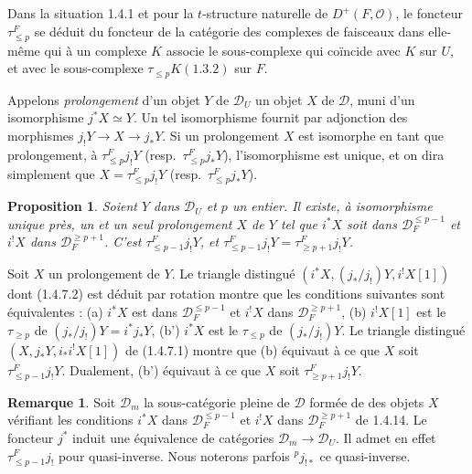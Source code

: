 \documentclass[12pt,a4paper]{article}
\theoremstyle{plain}
\newtheorem{proposition}[theorem]{Proposition}
\theoremstyle{definition}
\newtheorem{remark}[theorem]{Remarque}
\begin{document}
Dans la situation 1.4.1 et pour la $t$-structure naturelle de $D^+(F, \mathcal{O})$, le foncteur $\tau_{\leqslant p}^F$ se d\'eduit du foncteur de la cat\'egorie des complexes de faisceaux dans elle-m\^eme qui \`a un complexe $K$ associe le sous-complexe qui co\"incide avec $K$ sur $U$, et avec le sous-complexe $\tau_{\leqslant p}K(1.3.2)$ sur $F$.

Appelons \emph{prolongement} d'un objet $Y$ de $\mathcal{D}_U$ un objet $X$ de $\mathcal{D}$, muni d'un isomorphisme $j^*X \simeq Y$. Un tel isomorphisme fournit par adjonction des morphismes $j_!Y \to X \to j_*Y$. Si un prolongement $X$ est isomorphe en tant que prolongement, \`a $\tau_{\leqslant p}^F j_!Y$ (resp.\ $\tau_{\leqslant p}^F j_*Y$), l'isomorphisme est unique, et on dira simplement que $X = \tau_{\leqslant p}^F j_!Y$ (resp.\ $\tau_{\leqslant p}^F j_*Y$).

\begin{proposition}\label{prop:1.4.14}
Soient $Y$ dans $\mathcal{D}_U$ et $p$ un entier. Il existe, \`a isomorphisme unique pr\`es, un et un seul prolongement $X$ de $Y$ tel que $i^*X$ soit dans $\mathcal{D}_F^{\leqslant p-1}$ et $i^!X$ dans $\mathcal{D}_F^{\geqslant p+1}$. C'est $\tau_{\leqslant p-1}^F j_!Y$, et $\tau_{\leqslant p-1}^F j_!Y = \tau_{\geqslant p+1}^F j_!Y$.
\end{proposition}

Soit $X$ un prolongement de $Y$. Le triangle distingu\'e $(i^*X, (j_*/j_!)Y, i^!X[1])$ dont (1.4.7.2) est d\'eduit par rotation montre que les conditions suivantes sont \'equivalentes : (a) $i^*X$ est dans $\mathcal{D}_F^{\leqslant p-1}$ et $i^!X$ dans $\mathcal{D}_F^{\geqslant p+1}$, (b) $i^!X[1]$ est le $\tau_{\geqslant p}$ de $(j_*/j_!)Y = i^*j_*Y$, (b') $i^*X$ est le $\tau_{\leqslant p}$ de $(j_*/j_!)Y$. Le triangle distingu\'e $(X, j_*Y, i_*i^!X[1])$ de (1.4.7.1) montre que (b) \'equivaut \`a ce que $X$ soit $\tau_{\leqslant p-1}^F j_!Y$. Dualement, (b') \'equivaut \`a ce que $X$ soit $\tau_{\geqslant p+1}^F j_!Y$.

\begin{remark}\label{rem:1.4.14.1}
Soit $\mathcal{D}_m$ la sous-cat\'egorie pleine de $\mathcal{D}$ form\'ee de des objets $X$ v\'erifiant les conditions $i^*X$ dans $\mathcal{D}_F^{\leqslant p-1}$ et $i^!X$ dans $\mathcal{D}_F^{\geqslant p+1}$ de 1.4.14. Le foncteur $j^*$ induit une \'equivalence de cat\'egories $\mathcal{D}_m \to \mathcal{D}_U$. Il admet en effet $\tau_{\leqslant p-1}^F j_!$ pour quasi-inverse. Nous noterons parfois ${}^p j_{!*}$ ce quasi-inverse.
\end{remark}
\end{document}
